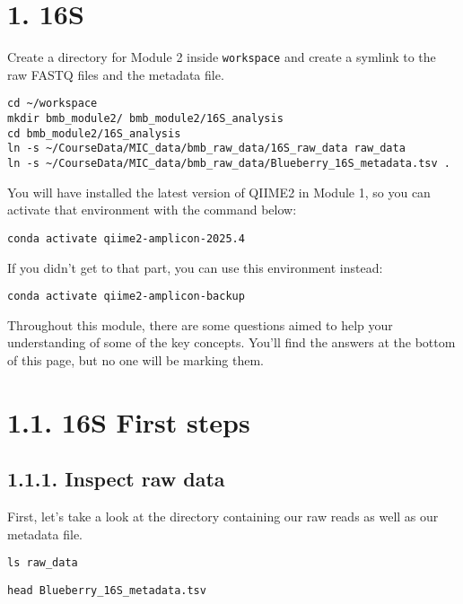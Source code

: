 \documentclass[
]{book}
\begin{document}
\section{1. 16S}\label{s}

Create a directory for Module 2 inside \texttt{workspace} and create a symlink to the raw FASTQ files and the metadata file.

\begin{verbatim}
cd ~/workspace
mkdir bmb_module2/ bmb_module2/16S_analysis
cd bmb_module2/16S_analysis
ln -s ~/CourseData/MIC_data/bmb_raw_data/16S_raw_data raw_data
ln -s ~/CourseData/MIC_data/bmb_raw_data/Blueberry_16S_metadata.tsv .
\end{verbatim}

You will have installed the latest version of QIIME2 in Module 1, so you can activate that environment with the command below:

\begin{verbatim}
conda activate qiime2-amplicon-2025.4
\end{verbatim}

If you didn't get to that part, you can use this environment instead:

\begin{verbatim}
conda activate qiime2-amplicon-backup
\end{verbatim}

Throughout this module, there are some questions aimed to help your understanding of some of the key concepts. You'll find the answers at the bottom of this page, but no one will be marking them.

\section{1.1. 16S First steps}\label{s-first-steps}

\subsection{1.1.1. Inspect raw data}\label{inspect-raw-data}

First, let's take a look at the directory containing our raw reads as well as our metadata file.

\begin{verbatim}
ls raw_data
\end{verbatim}

\begin{verbatim}
head Blueberry_16S_metadata.tsv
\end{verbatim}
\end{document}
